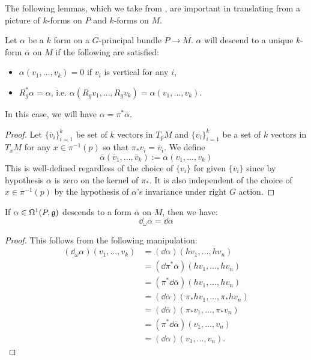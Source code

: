 		
		The following lemmas, which we take from \cite{kobayashi1963}, are important in translating from a picture of $k$-forms on $P$ and $k$-forms on $M$.
		\begin{lemma}
			Let $\alpha$ be a $k$ form on a $G$-principal bundle $P \to M$. $\alpha$ will descend to a unique $k$-form $\overline \alpha$ on $M$ if the following are satisfied:
			\begin{itemize}
				\item $\alpha(v_1, \dots, v_k) = 0$ if $v_i$ is vertical for any $i$,
				\item $R_g^* \alpha = \alpha$, i.e. $\alpha(R_g v_1, \dots, R_g v_k)=\alpha(v_1, \dots, v_k)$.
			\end{itemize}
			In this case, we will have $\alpha = \pi^* \overline \alpha$.
			\label{lem:pushdown1}
		\end{lemma}
		\begin{proof}
			Let $\{\overline v_i\}_{i=1}^k$ be set of $k$ vectors in $T_p M$ and $\{v_i\}_{i=1}^k$ be a set of $k$ vectors in $T_x M$ for any $x \in \pi^{-1} (p)$ so that $\pi_* v_i = \overline v_i$. We define
			\[
				\overline \alpha(\overline v_1, \dots, \overline v_k) := \alpha(v_1, \dots, v_k)
			\]
			This is well-defined regardless of the choice of $\{v_i\}$ for given $\{\overline v_i\}$ since by hypothesis $\alpha$ is zero on the kernel of $\pi_*$. It is also independent of the choice of $x \in \pi^{-1}(p)$ by the hypothesis of $\alpha$'s invariance under right $G$ action.
		\end{proof}
		
		\begin{lemma}
			If $\alpha \in \Omega^1 (P, \frak g)$ descends to a form $\overline \alpha$ on $M$, then we have:
			\begin{equation}
				\dd_\omega \alpha = \dd \alpha
			\end{equation}
			\label{lem:pushdown2}
		\end{lemma}
		\begin{proof}
			This follows from the following manipulation:
			\[
				\begin{aligned}
					(\dd_\omega \alpha) (v_1, \dots, v_k) &= (\dd \alpha) (h v_1, \dots, h v_n)\\
					& = (\dd \pi^* \overline \alpha) (h v_1, \dots, h v_n)\\
					& = (\pi^* \dd \overline \alpha) (h v_1, \dots, h v_n)\\
					& = (\dd \overline \alpha) (\pi_* h v_1, \dots, \pi_* h v_n)\\
					& = (\dd \overline \alpha) (\pi_* v_1, \dots, \pi_* v_n)\\
					& = (\pi^* \dd \overline \alpha) (v_1, \dots, v_n)\\
					& = (\dd \alpha) (v_1, \dots, v_n).
				\end{aligned}
			\]
		\end{proof}

